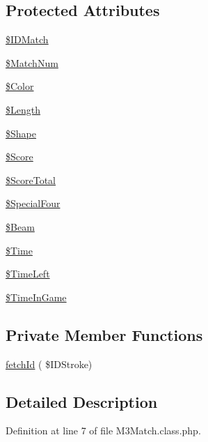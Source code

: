 \subsection*{Protected Attributes}
\begin{DoxyCompactItemize}
\item 
\hyperlink{class_m3_match_a879d934730f5c77062b00f9ed4273c73}{\$\+I\+D\+Match}
\item 
\hyperlink{class_m3_match_ad0e3736477d5da9e51bfe1401ec6d55f}{\$\+Match\+Num}
\item 
\hyperlink{class_m3_match_a19d1afdbbd72b0c08e194dcb59a2ec2f}{\$\+Color}
\item 
\hyperlink{class_m3_match_ab7d037b6cb814738a71c8cb1efea2ca5}{\$\+Length}
\item 
\hyperlink{class_m3_match_a4cefe61af3f6b7ee10b8880d3bafb4ba}{\$\+Shape}
\item 
\hyperlink{class_m3_match_a5d1a16aaf9199225b6586fda06089a99}{\$\+Score}
\item 
\hyperlink{class_m3_match_a1f18bccdf6e1477c5e1b30a9e78bc48e}{\$\+Score\+Total}
\item 
\hyperlink{class_m3_match_a7a70ce69417a4ce79a288763f910747b}{\$\+Special\+Four}
\item 
\hyperlink{class_m3_match_ad0122832fc8f30405639005971b76e4b}{\$\+Beam}
\item 
\hyperlink{class_m3_match_a44e6696649ea4fa46055e957c3169613}{\$\+Time}
\item 
\hyperlink{class_m3_match_af6569ffda9b1b34c9225d6339966b776}{\$\+Time\+Left}
\item 
\hyperlink{class_m3_match_ad82f36096b23369f88443a221e8334c9}{\$\+Time\+In\+Game}
\end{DoxyCompactItemize}
\subsection*{Private Member Functions}
\begin{DoxyCompactItemize}
\item 
\hyperlink{class_m3_match_a43c3f9c8f276a069911effc919d77911}{fetch\+Id} ( \$I\+D\+Stroke)
\end{DoxyCompactItemize}


\subsection{Detailed Description}


Definition at line 7 of file M3\+Match.\+class.\+php.



